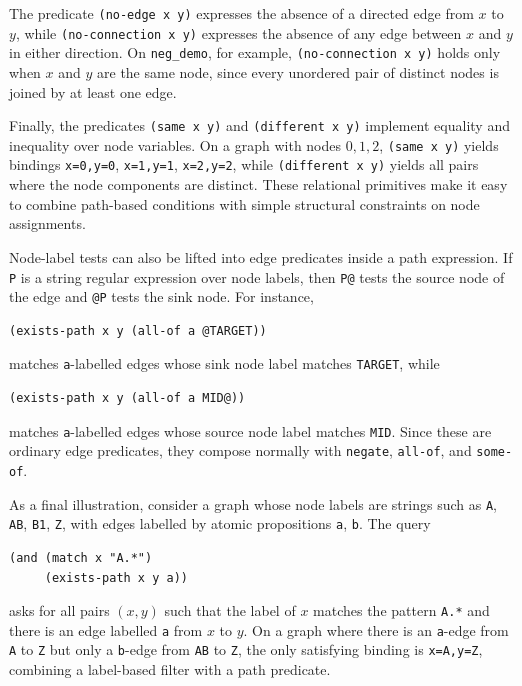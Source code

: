 \documentclass[11pt]{article}
\begin{document}
The predicate \texttt{(no-edge x y)} expresses the absence of a
directed edge from $x$ to $y$, while \texttt{(no-connection x y)}
expresses the absence of any edge between $x$ and $y$ in either
direction.  On \texttt{neg\_demo}, for example, \texttt{(no-connection
  x y)} holds only when $x$ and $y$ are the same node, since every
unordered pair of distinct nodes is joined by at least one edge.

Finally, the predicates \texttt{(same x y)} and \texttt{(different x
  y)} implement equality and inequality over node variables.  On a
graph with nodes $0,1,2$, \texttt{(same x y)} yields bindings
\texttt{x=0,y=0}, \texttt{x=1,y=1}, \texttt{x=2,y=2}, while
\texttt{(different x y)} yields all pairs where the node components
are distinct.  These relational primitives make it easy to combine
path-based conditions with simple structural constraints on node
assignments.

Node-label tests can also be lifted into edge predicates inside a path
expression.  If \texttt{P} is a string regular expression over node
labels, then \texttt{P@} tests the source node of the edge and
\texttt{@P} tests the sink node.  For instance,
\begin{verbatim}
(exists-path x y (all-of a @TARGET))
\end{verbatim}
matches \texttt{a}-labelled edges whose sink node label matches
\texttt{TARGET}, while
\begin{verbatim}
(exists-path x y (all-of a MID@))
\end{verbatim}
matches \texttt{a}-labelled edges whose source node label matches
\texttt{MID}.  Since these are ordinary edge predicates, they compose
normally with \texttt{negate}, \texttt{all-of}, and \texttt{some-of}.

As a final illustration, consider a graph whose node labels are
strings such as \texttt{A}, \texttt{AB}, \texttt{B1}, \texttt{Z},
with edges labelled by atomic propositions \texttt{a}, \texttt{b}.
The query
\begin{verbatim}
(and (match x "A.*")
     (exists-path x y a))
\end{verbatim}
asks for all pairs $(x,y)$ such that the label of $x$ matches the
pattern \texttt{A.*} and there is an edge labelled \texttt{a} from
$x$ to $y$.  On a graph where there is an \texttt{a}-edge from
\texttt{A} to \texttt{Z} but only a \texttt{b}-edge from \texttt{AB}
to \texttt{Z}, the only satisfying binding is
\texttt{x=A,y=Z}, combining a label-based filter with a path
predicate.
\end{document}

